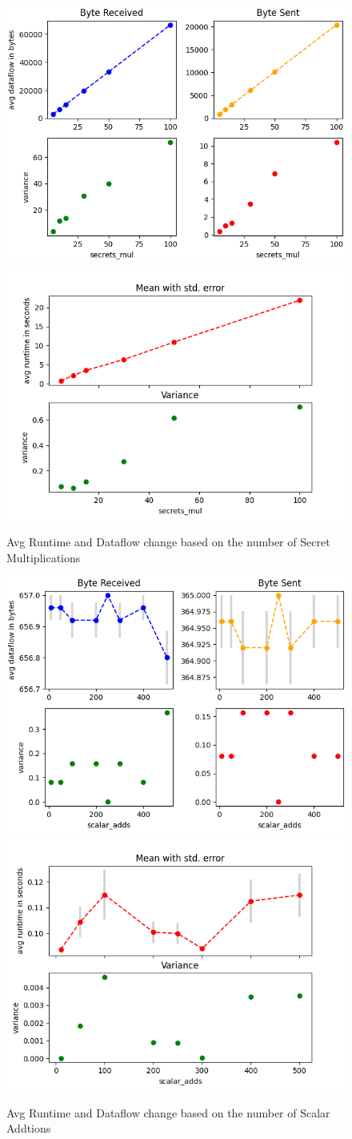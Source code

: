 \documentclass[10pt,conference,compsocconf]{IEEEtran}
\begin{document}
\begin{figure}[h!]
    \includegraphics[width=0.49\linewidth]{../performance_analysis/dataflow_secrets_multiplications.png}
    \includegraphics[width=0.49\linewidth]{../performance_analysis/runtime_secrets_multiplications.png}
    \caption{Avg Runtime and Dataflow change based on the number of Secret Multiplications}
    \label{fig:num_multiplications}
\end{figure}

\begin{figure}[h!]
    \centering
    \includegraphics[width=0.49\linewidth]{../performance_analysis/dataflow_scalar_additions.png}
    \includegraphics[width=0.49\linewidth]{../performance_analysis/runtime_scalar_additions.png}
    \caption{Avg Runtime and Dataflow change based on the number of Scalar Addtions}
    \label{fig:scalar_add}
\end{figure}
\end{document}
